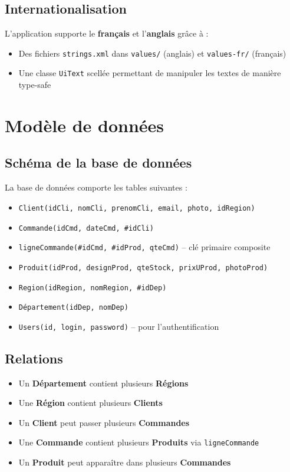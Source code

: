 \documentclass[12pt,a4paper]{article}
\begin{document}
\subsection{Internationalisation}

L'application supporte le \textbf{fran\c{c}ais} et l'\textbf{anglais} gr\^ace \`a :
\begin{itemize}
    \item Des fichiers \texttt{strings.xml} dans \texttt{values/} (anglais) et \texttt{values-fr/} (fran\c{c}ais)
    \item Une classe \texttt{UiText} scell\'ee permettant de manipuler les textes de mani\`ere type-safe
\end{itemize}

\section{Mod\`ele de donn\'ees}

\subsection{Sch\'ema de la base de donn\'ees}

La base de donn\'ees comporte les tables suivantes :

\begin{itemize}
    \item \texttt{Client(idCli, nomCli, prenomCli, email, photo, idRegion)}
    \item \texttt{Commande(idCmd, dateCmd, \#idCli)}
    \item \texttt{ligneCommande(\#idCmd, \#idProd, qteCmd)} -- cl\'e primaire composite
    \item \texttt{Produit(idProd, designProd, qteStock, prixUProd, photoProd)}
    \item \texttt{Region(idRegion, nomRegion, \#idDep)}
    \item \texttt{D\'epartement(idDep, nomDep)}
    \item \texttt{Users(id, login, password)} -- pour l'authentification
\end{itemize}

\subsection{Relations}

\begin{itemize}
    \item Un \textbf{D\'epartement} contient plusieurs \textbf{R\'egions}
    \item Une \textbf{R\'egion} contient plusieurs \textbf{Clients}
    \item Un \textbf{Client} peut passer plusieurs \textbf{Commandes}
    \item Une \textbf{Commande} contient plusieurs \textbf{Produits} via \texttt{ligneCommande}
    \item Un \textbf{Produit} peut appara\^itre dans plusieurs \textbf{Commandes}
\end{itemize}
\end{document}
